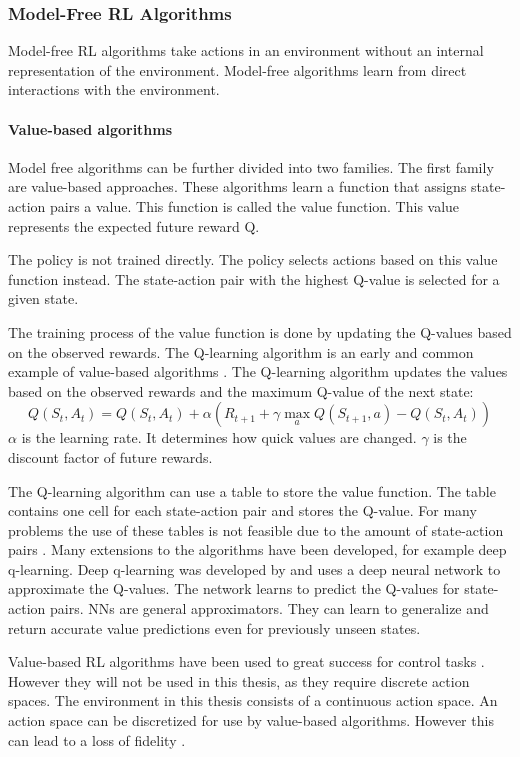 \subsubsection{Model-Free \ac{RL} Algorithms}

Model-free \ac{RL} algorithms take actions in an environment without an internal representation of the environment. Model-free algorithms learn from direct interactions with the environment.

\paragraph{Value-based algorithms}
Model free algorithms can be further divided into two families. The first family are value-based approaches. These algorithms learn a function that assigns state-action pairs a value. This function is called the value function. This value represents the expected future reward Q.
 
The policy is not trained directly. The policy selects actions based on this value function instead. The state-action pair with the highest Q-value is selected for a given state.

The training process of the value function is done by updating the Q-values based on the observed rewards. The Q-learning algorithm is an early and common example of value-based algorithms \textcite{rlbook2020}. The Q-learning algorithm updates the values based on the observed rewards and the maximum Q-value of the next state: \[Q(S_t, A_t) = Q(S_t, A_t) + \alpha (R_{t+1} + \gamma \max_a Q(S_{t+1}, a) - Q(S_t, A_t))\]
$\alpha$ is the learning rate. It determines how quick values are changed. $\gamma$ is the discount factor of future rewards.


The Q-learning algorithm can use a table to store the value function. The table contains one cell for each state-action pair and stores the Q-value. 
For many problems the use of these tables is not feasible due to the amount of state-action pairs \autocite{rlbook2020}. Many extensions to the algorithms have been developed, for example deep q-learning. Deep q-learning was developed by \textcite{atari} and uses a deep neural network to approximate the Q-values. The network learns to predict the Q-values for state-action pairs. \acp{NN} are general approximators. They can learn to generalize and return accurate value predictions even for previously unseen states. 

Value-based \ac{RL} algorithms have been used to great success for control tasks \textcite{rlbook2020}. However they will not be used in this thesis, as they require discrete action spaces. The environment in this thesis consists of a continuous action space.
An action space can be discretized for use by value-based algorithms. However this can lead to a loss of fidelity \autocite{drl_for_ad}.


